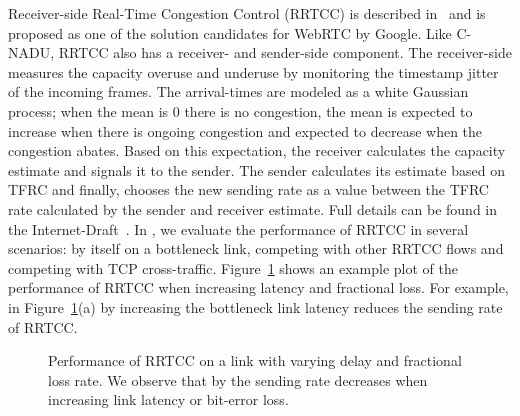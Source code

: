 Receiver-side Real-Time Congestion Control (RRTCC) is described
in~\cite{draft.rrtcc} and is proposed as one of the solution candidates for
WebRTC by Google. Like C-NADU, RRTCC also has a receiver- and sender-side
component. The receiver-side measures the capacity overuse and underuse by
monitoring the timestamp jitter of the incoming frames. The arrival-times are
modeled as a white Gaussian process; when the mean is 0 there is no
congestion, the mean is expected to increase when there is ongoing congestion
and expected to decrease when the congestion abates. Based on this
expectation, the receiver calculates the capacity estimate and signals it to
the sender. The sender calculates its estimate based on TFRC and finally,
chooses the new sending rate as a value between the TFRC rate calculated by
the sender and receiver estimate. Full details can be found in the
Internet-Draft~\cite{draft.rrtcc}. In , we evaluate the
performance of RRTCC in several scenarios: by itself on a bottleneck link,
competing with other RRTCC flows and competing with TCP cross-traffic.
Figure~\ref{fig:rrtcc} shows an example plot of the performance of RRTCC when
increasing latency and fractional loss. For example, in
Figure~\ref{fig:rrtcc}(a) by increasing the bottleneck link latency reduces
the sending rate of RRTCC.

\begin{figure}
  \centerline{
  }
  \caption{Performance of RRTCC on a link with varying delay and fractional
  loss rate. We observe that by the sending rate decreases when increasing
  link latency or bit-error loss. }
  \label{fig:rrtcc}
\end{figure}

% 
